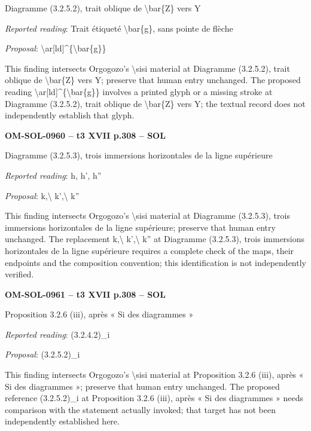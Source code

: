 Diagramme (3.2.5.2), trait oblique de \textbackslash{}bar\{Z\} vers Y\par
\emph{Reported reading}: Trait étiqueté \textbackslash{}bar\{g\}, sans pointe de flèche\par
\emph{Proposal}: \textbackslash{}ar[ld]\textasciicircum{}\{\textbackslash{}bar\{g\}\}\par
This finding intersects Orgogozo's \textbackslash{}sisi material at Diagramme (3.2.5.2), trait oblique de \textbackslash{}bar\{Z\} vers Y; preserve that human entry unchanged. The proposed reading \textbackslash{}ar[ld]\textasciicircum{}\{\textbackslash{}bar\{g\}\} involves a printed glyph or a missing stroke at Diagramme (3.2.5.2), trait oblique de \textbackslash{}bar\{Z\} vers Y; the textual record does not independently establish that glyph.\par
\par\noindent\textbf{OM-SOL-0960 -- t3 XVII p.308 -- SOL}\par
Diagramme (3.2.5.3), trois immersions horizontales de la ligne supérieure\par
\emph{Reported reading}: h, h', h''\par
\emph{Proposal}: k,\textbackslash{} k',\textbackslash{} k''\par
This finding intersects Orgogozo's \textbackslash{}sisi material at Diagramme (3.2.5.3), trois immersions horizontales de la ligne supérieure; preserve that human entry unchanged. The replacement k,\textbackslash{} k',\textbackslash{} k'' at Diagramme (3.2.5.3), trois immersions horizontales de la ligne supérieure requires a complete check of the maps, their endpoints and the composition convention; this identification is not independently verified.\par
\par\noindent\textbf{OM-SOL-0961 -- t3 XVII p.308 -- SOL}\par
Proposition 3.2.6 (iii), après « Si des diagrammes »\par
\emph{Reported reading}: (3.2.4.2)\_i\par
\emph{Proposal}: (3.2.5.2)\_i\par
This finding intersects Orgogozo's \textbackslash{}sisi material at Proposition 3.2.6 (iii), après « Si des diagrammes »; preserve that human entry unchanged. The proposed reference (3.2.5.2)\_i at Proposition 3.2.6 (iii), après « Si des diagrammes » needs comparison with the statement actually invoked; that target has not been independently established here.\par
